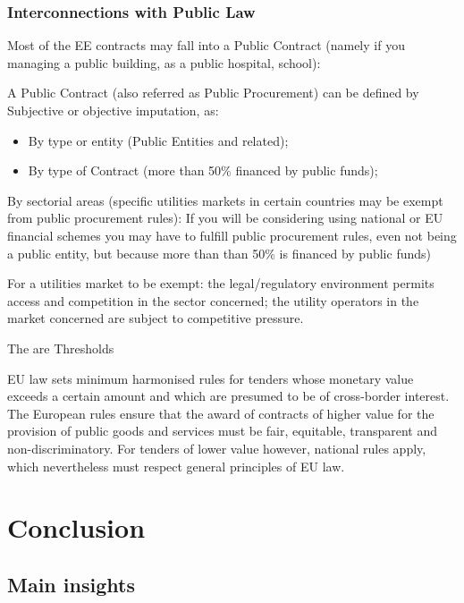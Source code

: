 \documentclass[]{book}
\providecommand{\tightlist}{%
  \setlength{\itemsep}{0pt}\setlength{\parskip}{0pt}}
\theoremstyle{definition}
\theoremstyle{definition}
\theoremstyle{definition}
\theoremstyle{remark}
\begin{document}
\subsection{Interconnections with Public
Law}\label{interconnections-with-public-law}

Most of the EE contracts may fall into a Public Contract (namely if you
managing a public building, as a public hospital, school):

A Public Contract (also referred as Public Procurement) can be defined
by Subjective or objective imputation, as:

\begin{itemize}
\tightlist
\item
  By type or entity (Public Entities and related);
\item
  By type of Contract (more than 50\% financed by public funds);
\end{itemize}

By sectorial areas (specific utilities markets in certain countries may
be exempt from public procurement rules): If you will be considering
using national or EU financial schemes you may have to fulfill public
procurement rules, even not being a public entity, but because more than
than 50\% is financed by public funds)

For a utilities market to be exempt: the legal/regulatory environment
permits access and competition in the sector concerned; the utility
operators in the market concerned are subject to competitive pressure.

The are Thresholds

EU law sets minimum harmonised rules for tenders whose monetary value
exceeds a certain amount and which are presumed to be of cross-border
interest. The European rules ensure that the award of contracts of
higher value for the provision of public goods and services must be
fair, equitable, transparent and non-discriminatory. For tenders of
lower value however, national rules apply, which nevertheless must
respect general principles of EU law.

\chapter{Conclusion}\label{conclusion}

\section{Main insights}\label{main-insights}
\end{document}

